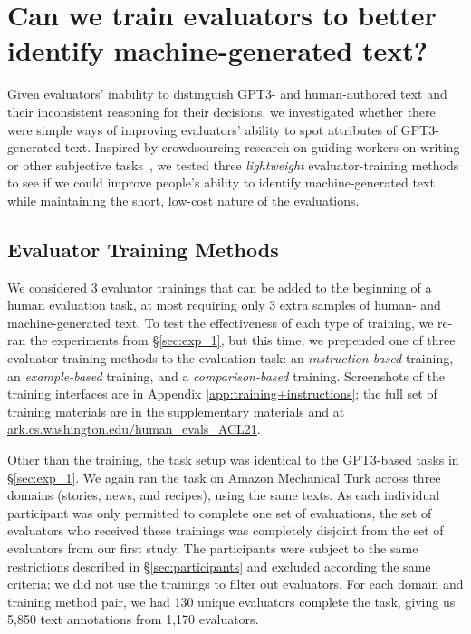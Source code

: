 \section{Can we train evaluators to better identify machine-generated text?}\label{sec:exp_2}

Given evaluators' inability to distinguish GPT3- and human-authored text and their inconsistent reasoning for their decisions, we investigated whether there were simple ways of improving evaluators' ability to spot attributes of GPT3-generated text.
Inspired by crowdsourcing research on guiding workers on writing or other subjective tasks~\cite{kim2017mechanical, mitra_crowdsourcing}, we tested three \emph{lightweight} evaluator-training methods to see if we could improve people's ability to identify machine-generated text while maintaining the short, low-cost nature of the evaluations. 


\subsection{Evaluator Training Methods}
We considered 3 evaluator trainings that can be added to the beginning of a human evaluation task, at most requiring only 3 extra samples of human- and machine-generated text. 
To test the effectiveness of each type of training, we re-ran the experiments from \S\ref{sec:exp_1}, but this time, we prepended one of three  evaluator-training methods to the evaluation task: an \emph{instruction-based} training, an \emph{example-based} training, and a \emph{comparison-based} training.
Screenshots of the training interfaces are in Appendix \ref{app:training+instructions}; the full set of training materials are in the supplementary materials and at \url{ark.cs.washington.edu/human_evals_ACL21}.

Other than the training, the task setup was identical to the GPT3-based tasks in \S\ref{sec:exp_1}.
We again ran the task on Amazon Mechanical Turk across three domains (stories, news, and recipes), using the same texts.
As each individual participant was only permitted to complete one set of evaluations, the set of evaluators who received these trainings was completely disjoint from the set of evaluators from our first study.
The participants were subject to the same restrictions described in \S\ref{sec:participants} and excluded according the same criteria; we did not use the trainings to filter out evaluators.
For each domain and training method pair, we had 130 unique evaluators complete the task, giving us 5,850 text annotations from 1,170 evaluators.

